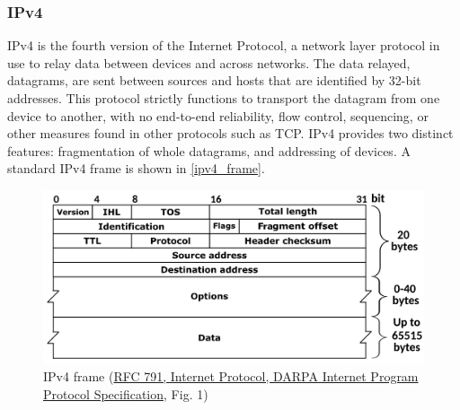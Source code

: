 \subsubsection{IPv4} IPv4 is the fourth version of the Internet Protocol, a network layer protocol in use to relay data between devices and across networks. The data relayed, datagrams, are sent between sources and hosts that are identified by 32-bit addresses. This protocol strictly functions to transport the datagram from one device to another, with no end-to-end reliability, flow control, sequencing, or other measures found in other protocols such as TCP. IPv4 provides two distinct features: fragmentation of whole datagrams, and addressing of devices. A standard IPv4 frame is shown in \autoref{ipv4_frame}.
\begin{figure}[H]
    \caption{IPv4 frame (\href{https://dx.doi.org/10.17487/RFC0791}{RFC 791, Internet Protocol, DARPA Internet Program Protocol Specification}, Fig. 1) \cite{Postel1981}}
    \label{ipv4_frame}
    \centering
    \includegraphics[width=\textwidth]{images/ipv4_frame.png}
\end{figure}

